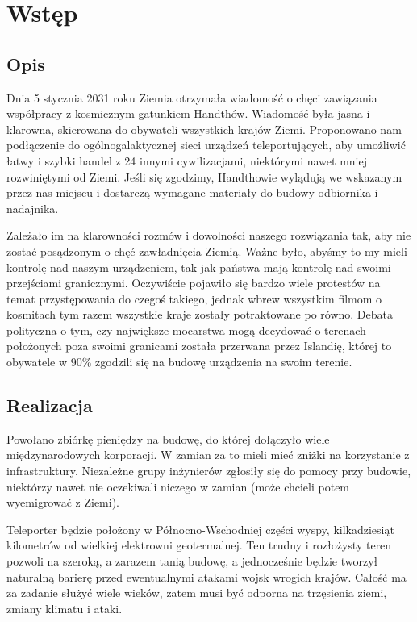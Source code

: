 \chapter{Wstęp}
\section{Opis}
Dnia 5 stycznia 2031 roku Ziemia otrzymała wiadomość o chęci zawiązania współpracy z kosmicznym gatunkiem Handthów.
Wiadomość była jasna i klarowna, skierowana do obywateli wszystkich krajów Ziemi.
Proponowano nam podłączenie do ogólnogalaktycznej sieci urządzeń teleportujących, aby umożliwić łatwy i szybki handel z 24 innymi cywilizacjami, niektórymi nawet mniej rozwiniętymi od Ziemi.
Jeśli się zgodzimy, Handthowie wylądują we wskazanym przez nas miejscu i dostarczą wymagane materiały do budowy odbiornika i nadajnika.

Zależało im na klarowności rozmów i dowolności naszego rozwiązania tak, aby nie zostać posądzonym o chęć zawładnięcia Ziemią.
Ważne było, abyśmy to my mieli kontrolę nad naszym urządzeniem, tak jak państwa mają kontrolę nad swoimi przejściami granicznymi.
Oczywiście pojawiło się bardzo wiele protestów na temat przystępowania do czegoś takiego, jednak wbrew wszystkim filmom o kosmitach tym razem wszystkie kraje zostały potraktowane po równo.
Debata polityczna o tym, czy największe mocarstwa mogą decydować o terenach położonych poza swoimi granicami została przerwana przez Islandię, której to obywatele w 90\% zgodzili się na budowę urządzenia na swoim terenie.

\section{Realizacja}
Powołano zbiórkę pieniędzy na budowę, do której dołączyło wiele międzynarodowych korporacji.
W zamian za to mieli mieć zniżki na korzystanie z infrastruktury.
Niezależne grupy inżynierów zgłosiły się do pomocy przy budowie, niektórzy nawet nie oczekiwali niczego w zamian (może chcieli potem wyemigrować z Ziemi).

Teleporter będzie położony w Północno-Wschodniej części wyspy, kilkadziesiąt kilometrów od wielkiej elektrowni geotermalnej.
Ten trudny i rozłożysty teren pozwoli na szeroką, a zarazem tanią budowę, a jednocześnie będzie tworzył naturalną barierę przed ewentualnymi atakami wojsk wrogich krajów.
Całość ma za zadanie służyć wiele wieków, zatem musi być odporna na trzęsienia ziemi, zmiany klimatu i ataki.

